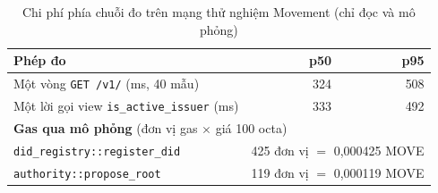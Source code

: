 \begin{table}[H]
\centering
\caption{Chi phí phía chuỗi đo trên mạng thử nghiệm Movement (chỉ đọc và mô phỏng)}
\label{tab:v2-chain}
\renewcommand{\arraystretch}{1.2}
\small
\begin{tabular}{|p{6.6cm}|r|r|}
\hline
\textbf{Phép đo} & \textbf{p50} & \textbf{p95} \\ \hline
Một vòng \texttt{GET /v1/} (ms, 40 mẫu) & 324 & 508 \\ \hline
Một lời gọi view \texttt{is\_active\_issuer} (ms) & 333 & 492 \\ \hline
\multicolumn{3}{|l|}{\textbf{Gas qua mô phỏng} (đơn vị gas $\times$ giá 100 octa)} \\ \hline
\texttt{did\_registry::register\_did} & \multicolumn{2}{r|}{425 đơn vị $=$ 0{,}000425 MOVE} \\ \hline
\texttt{authority::propose\_root} & \multicolumn{2}{r|}{119 đơn vị $=$ 0{,}000119 MOVE} \\ \hline
\end{tabular}
\end{table}
